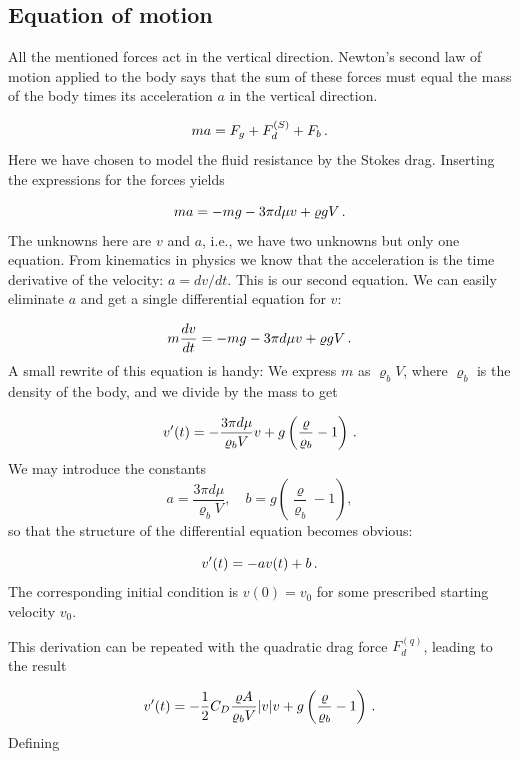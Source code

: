 \documentclass[%
oneside,                 %
final,                   %
10pt]{article}
\begin{document}
\subsection{Equation of motion}

All the mentioned forces act in the vertical direction.
Newton's second law of motion applied to the body says that the sum of
these forces must equal the mass of the body times its acceleration
$a$ in the vertical direction.

\begin{equation*} ma = F_g + F_d^{(S)} + F_b \tp\end{equation*}
Here we have chosen to model the fluid resistance by the Stokes drag.
Inserting the expressions for the forces yields

\[  ma = -mg - 3\pi d\mu v + \varrho gV
\tp
\]
The unknowns here are $v$ and $a$, i.e., we have two unknowns but only
one equation. From kinematics in physics we know that
the acceleration is the time derivative of the velocity: $a = dv/dt$.
This is our second equation.
We can easily eliminate $a$ and get a single differential equation for $v$:

\[ m{dv\over dt} = -mg - 3\pi d\mu v + \varrho gV
\tp
\]
A small rewrite of this equation is handy: We express $m$ as $\varrho_bV$,
where $\varrho_b$ is the density of the body, and we divide by
the mass to get

\begin{equation}
v^{\prime}(t) = - \frac{3\pi d\mu}{\varrho_b V} v + g\left(\frac{\varrho}{\varrho_b} -1\right)
\label{decay:app:fallingbody:model:S}
\tp
\end{equation}
We may introduce the constants
\begin{equation}
a = \frac{3\pi d\mu}{\varrho_b V},\quad
b = g\left(\frac{\varrho}{\varrho_b} -1\right),
\end{equation}
so that the structure of the differential equation becomes obvious:

\begin{equation}
v^{\prime}(t) = -av(t) + b
\label{decay:app:fallingbody:gmodel:S}
\tp
\end{equation}
The corresponding initial condition is $v(0)=v_0$ for some prescribed
starting velocity $v_0$.

This derivation can be repeated with the quadratic drag force
$F_d^{(q)}$, leading to the result

\begin{equation}
v^{\prime}(t) =
-{1\over2}C_D{\varrho A\over\varrho_b V}|v|v +
g\left({\varrho\over\varrho_b} - 1\right)
\tp
\label{decay:app:fallingbody:model:q}
\end{equation}
Defining
\end{document}
